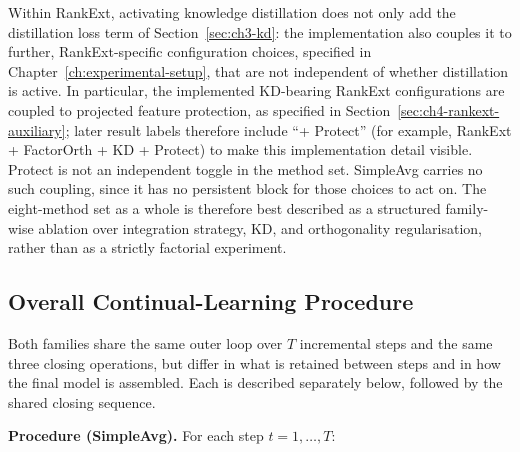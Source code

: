 Within RankExt, activating knowledge distillation does not only add the
distillation loss term of Section~\ref{sec:ch3-kd}: the implementation also
couples it to further, RankExt-specific configuration choices, specified in
Chapter~\ref{ch:experimental-setup}, that are not independent of whether
distillation is active. In particular, the implemented KD-bearing RankExt
configurations are coupled to projected feature protection, as specified
in Section~\ref{sec:ch4-rankext-auxiliary}; later result labels therefore
include ``+ Protect'' (for example, RankExt + FactorOrth + KD + Protect) to
make this implementation detail visible. Protect is not an independent
toggle in the method set. SimpleAvg carries no such coupling, since it has
no persistent block for those choices to act on. The eight-method set as a
whole is therefore best described as a structured family-wise ablation over
integration strategy, KD, and orthogonality regularisation, rather than as
a strictly factorial experiment.

\subsection{Overall Continual-Learning Procedure}
\label{sec:ch3-procedure}

Both families share the same outer loop over $T$ incremental steps and the
same three closing operations, but differ in what is retained between
steps and in how the final model is assembled. Each is described
separately below, followed by the shared closing sequence.

\textbf{Procedure (SimpleAvg).} For each step $t=1,\dots,T$:

